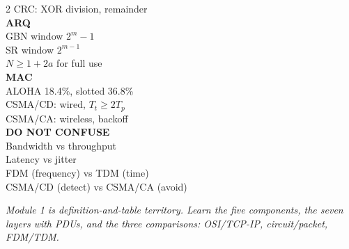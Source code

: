 \documentclass[11pt,a4paper]{article}
\begin{document}
\begin{multicols}{2}
CRC: XOR division, remainder\\[5pt]
\textbf{ARQ}\\
GBN window $2^m-1$\\
SR window $2^{m-1}$\\
$N \ge 1+2a$ for full use\\[5pt]
\textbf{MAC}\\
ALOHA 18.4\%, slotted 36.8\%\\
CSMA/CD: wired, $T_t \ge 2T_p$\\
CSMA/CA: wireless, backoff\\[5pt]
\textbf{DO NOT CONFUSE}\\
Bandwidth vs throughput\\
Latency vs jitter\\
FDM (frequency) vs TDM (time)\\
CSMA/CD (detect) vs CSMA/CA (avoid)
\end{multicols}

\vfill
\begin{center}\textit{Module 1 is definition-and-table territory. Learn the five components, the seven layers with PDUs, and the three comparisons: OSI/TCP-IP, circuit/packet, FDM/TDM.}\end{center}
\end{document}
